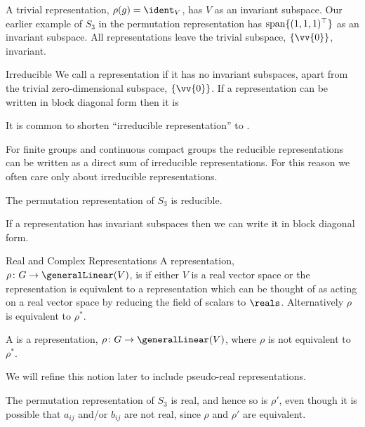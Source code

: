 A trivial representation, \(\rho(g) = \ident_V\), has \(V\) as an invariant
subspace.
Our earlier example of \(S_3\) in the permutation representation has
\(\operatorname{span}\{(1, 1, 1)^\top\}\) as an invariant subspace.
All representations leave the trivial subspace, \(\{\vv{0}\}\), invariant.

\begin{dfn}{Irreducible}{}
    We call a representation  if it has no invariant subspaces, apart from the trivial
    zero-dimensional subspace, \(\{\vv{0}\}\).
    If a representation can be written in block diagonal form then it is
\end{dfn}

It is common to shorten \enquote{irreducible representation} to
.

For finite groups and continuous compact groups the reducible
representations can be written as a direct sum of irreducible representations.
For this reason we often care only about irreducible representations.

The permutation representation of \(S_3\) is reducible.

\begin{lma}{}{}
    If a representation has invariant subspaces then we can write it in
    block diagonal form.
\end{lma}

\begin{dfn}{Real and Complex Representations}{}
    A representation, \(\rho \colon G \to \generalLinear(V)\), is
     if either \(V\) is a real vector space
    or the representation is equivalent to a representation which can be thought of
    as acting on a real vector space by reducing the field of scalars to \(\reals\).
    Alternatively \(\rho\) is equivalent to \(\rho^*\).
    
    A  is a representation, \(\rho
    \colon G \to \generalLinear(V)\), where \(\rho\) is not equivalent to
    \(\rho^*\).
\end{dfn}

We will refine this notion later to include pseudo-real representations.

The permutation representation of \(S_3\) is real, and hence so is
\(\rho'\), even though it is possible that \(a_{ij}\) and/or \(b_{ij}\) are not
real, since \(\rho\) and \(\rho'\) are equivalent.

